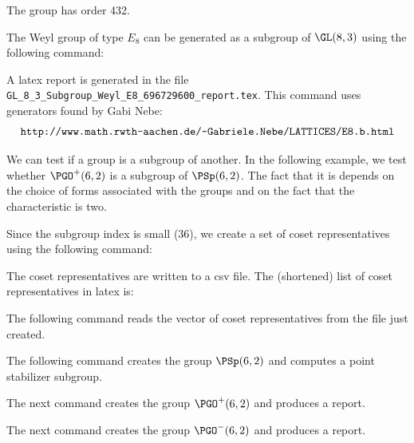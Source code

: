 
The group has order 432.

\bigskip



The Weyl group of type $E_8$ can be generated as a subgroup of $\GL(8,3)$ 
using the following command:




A latex report is generated in the file \verb'GL_8_3_Subgroup_Weyl_E8_696729600_report.tex'.
This command uses generators found by Gabi Nebe:
$$
\verb'http://www.math.rwth-aachen.de/~Gabriele.Nebe/LATTICES/E8.b.html'
$$


\bigskip


We can test if a group is a subgroup of another. 
In the following example, we test whether 
$\PGO^+(6,2)$ is a subgroup of $\PSp(6,2)$. 
The fact that it is depends on the choice of forms 
associated with the groups and on the fact that the characteristic is two.


Since the subgroup index is small (36), we create a set of 
coset representatives using the following command:


The coset representatives are written to a csv file.
The (shortened) list of coset representatives in latex is:

\bigskip


The following command reads the vector 
of coset representatives from the file just created.





\bigskip


The following command creates the group 
$\PSp(6,2)$ and computes a point stabilizer subgroup.



\bigskip

The next command creates the group 
$\PGO^+(6,2)$ and produces a report.



\bigskip



The next command creates the group 
$\PGO^-(6,2)$ and produces a report.

